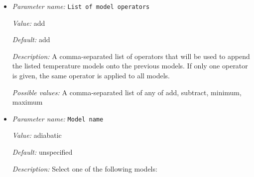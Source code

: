 \begin{itemize}
`polar box': An initial temperature field in which the temperature is perturbed slightly from an otherwise constant value equal to one. The perturbation is such that there are two poles on opposing corners of the box. 

`spherical gaussian perturbation': An initial temperature field in which the temperature is perturbed by a single Gaussian added to an otherwise spherically symmetric state. Additional parameters are read from the parameter file in subsection 'Spherical gaussian perturbation'.

`spherical hexagonal perturbation': An initial temperature field in which the temperature is perturbed following an $N$-fold pattern in a specified direction from an otherwise spherically symmetric state. The class's name comes from previous versions when the only option was $N=6$.


{\it Possible values:} A comma-separated list of any of S40RTS perturbation, SAVANI perturbation, adiabatic, adiabatic boundary, ascii data, ascii profile, function, harmonic perturbation, inclusion shape perturbation, mandelbox, patch on S40RTS, perturbed box, polar box, spherical gaussian perturbation, spherical hexagonal perturbation
\item {\it Parameter name:} {\tt List of model operators}
\label{parameters:Initial temperature model/List of model operators}


{\it Value:} add


{\it Default:} add


{\it Description:} A comma-separated list of operators that will be used to append the listed temperature models onto the previous models. If only one operator is given, the same operator is applied to all models.


{\it Possible values:} A comma-separated list of any of add, subtract, minimum, maximum
\item {\it Parameter name:} {\tt Model name}
\label{parameters:Initial temperature model/Model name}


{\it Value:} adiabatic


{\it Default:} unspecified


{\it Description:} Select one of the following models:


\end{itemize}
